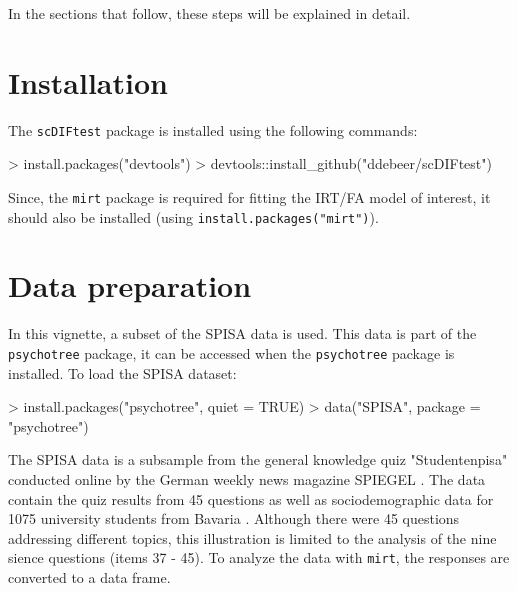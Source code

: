 \documentclass{article}
\begin{document}
In the sections that follow, these steps will be explained in detail.



\section{Installation}

The {\tt scDIFtest} package is installed using the following commands:

\begin{Schunk}
\begin{Sinput}
> install.packages("devtools")
> devtools::install_github("ddebeer/scDIFtest")
\end{Sinput}
\end{Schunk}

Since, the {\tt mirt} package \cite{Chalmers} is required for fitting the IRT/FA model of interest, it should also be installed (using {\tt install.packages("mirt")}).


\section{Data preparation}

In this vignette, a subset of the SPISA data is used. This data is part of the {\tt psychotree} package, it can be accessed when the {\tt psychotree} package is installed. To load the SPISA dataset:

\begin{Schunk}
\begin{Sinput}
> install.packages("psychotree", quiet = TRUE)
> data("SPISA", package = "psychotree")
\end{Sinput}
\end{Schunk}



The SPISA data is a subsample from the general knowledge quiz "Studentenpisa" conducted online by the German weekly news magazine SPIEGEL \cite{Spisa}. The data contain the quiz results from 45 questions as well as sociodemographic data for 1075 university students from Bavaria \cite{Spisa}. Although there were 45 questions addressing different topics, this illustration is limited to the analysis of the nine sience questions (items 37 - 45). To analyze the data with {\tt mirt}, the responses are converted to a data frame. 

\begin{Schunk}
\end{Schunk}
\end{document}
